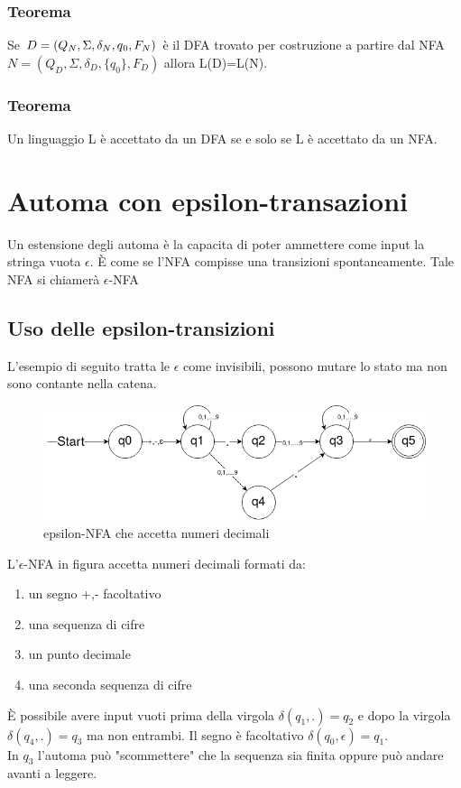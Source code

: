 \documentclass[12pt]{article}
\begin{document}
\subsubsection*{Teorema}
Se $D = (Q_N, \Sigma, \delta_N, q\textsubscript{0}, F_N)$ è il DFA trovato per costruzione a partire dal NFA $N = (Q_D, \Sigma, \delta_D, \{q_0\}, F_D)$ allora L(D)=L(N).

\subsubsection*{Teorema}
Un linguaggio L è accettato da un DFA se e solo se L è accettato da un NFA.

\newpage
\section{Automa con epsilon-transazioni}
Un estensione degli automa è la capacita di poter ammettere come input la stringa vuota $\epsilon$. È come se l'NFA compisse una transizioni spontaneamente. Tale NFA si chiamerà $\epsilon$-NFA

\subsection{Uso delle epsilon-transizioni}
L'esempio di seguito tratta le $\epsilon$ come invisibili, possono mutare lo stato ma non sono contante nella catena. 

\begin{figure}[h]
\includegraphics[scale = 0.5]{media/epsilon_nfa.png}
\centering
\caption{epsilon-NFA che accetta numeri decimali}
\end{figure}

L'$\epsilon$-NFA in figura accetta numeri decimali formati da: 
\begin{enumerate}
  \item un segno +,- facoltativo
  \item una sequenza di cifre
  \item un punto decimale
  \item una seconda sequenza di cifre
\end{enumerate}
È possibile avere input vuoti prima della virgola $\delta(q_1, .) = q_2$ e dopo la virgola $\delta(q_4, .) = q_3$ ma non entrambi. Il segno è facoltativo $\delta(q_0, \epsilon) = q_1$.
\\ In $q_3$ l'automa può "scommettere" che la sequenza sia finita oppure può andare avanti a leggere.
\end{document}
